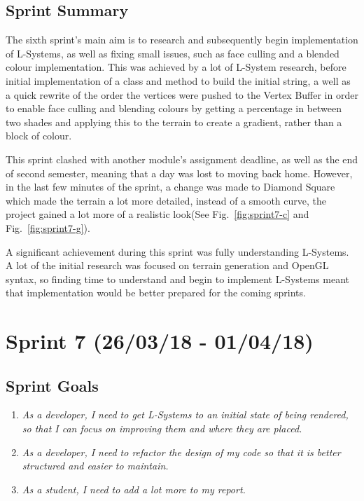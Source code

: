 \documentclass[a4paper,10pt]{report}
\begin{document}
\subsection{Sprint Summary}

The sixth sprint's main aim is to research and subsequently begin implementation of L-Systems, as well as fixing small issues, such as face culling and a blended colour implementation. This was achieved by a lot of L-System research, before initial implementation of a class and method to build the initial string, a well as a quick rewrite of the order the vertices were pushed to the Vertex Buffer in order to enable face culling and blending colours by getting a percentage in between two shades and applying this to the terrain to create a gradient, rather than a block of colour. \medskip

This sprint clashed with another module's assignment deadline, as well as the end of second semester, meaning that a day was lost to moving back home. However, in the last few minutes of the sprint, a change was made to Diamond Square which made the terrain a lot more detailed, instead of a smooth curve, the project gained a lot more of a realistic look(See Fig.~\ref{fig:sprint7-c} and Fig.~\ref{fig:sprint7-g}). \medskip

A significant achievement during this sprint was fully understanding L-Systems. A lot of the initial research was focused on terrain generation and OpenGL syntax, so finding time to understand and begin to implement L-Systems meant that implementation would be better prepared for the coming sprints.

\clearpage
\section{Sprint 7 (26/03/18 -  01/04/18)}

\subsection{Sprint Goals}

\begin{enumerate}

\item \textit{As a developer, I need to get L-Systems to an initial state of being rendered, so that I can focus on improving them and where they are placed.}

\item \textit{As a developer, I need to refactor the design of my code so that it is better structured and easier to maintain.}

\item \textit{As a student, I need to add a lot more to my report. }
\end{enumerate}
\end{document}
